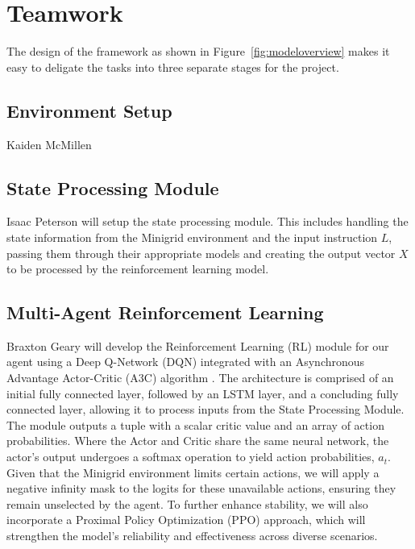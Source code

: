 \documentclass[11pt]{article}
\begin{document}
\section{Teamwork}

The design of the framework as shown in Figure~\ref{fig:modeloverview} makes it easy to deligate the tasks into three separate stages for the project. 

\subsection{Environment Setup}

Kaiden McMillen

\subsection{State Processing Module}
Isaac Peterson will setup the state processing module. This includes handling the state information from the Minigrid environment and the input instruction $L$, passing them through their appropriate models and creating the output vector $X$ to be processed by the reinforcement learning model. 

\subsection{Multi-Agent Reinforcement Learning}

Braxton Geary will develop the Reinforcement Learning (RL) module for our agent using a Deep Q-Network (DQN) integrated with an 
Asynchronous Advantage Actor-Critic (A3C) algorithm \cite{Mnih2016}. The architecture is comprised of an initial fully connected layer, followed by an LSTM layer, 
and a concluding fully connected layer, allowing it to process inputs from the State Processing Module. The module outputs a tuple with a scalar 
critic value and an array of action probabilities. Where the Actor and Critic share the same neural network, the actor's output undergoes a softmax operation 
to yield action probabilities, \( a_t \). Given that the Minigrid environment limits certain actions, we will apply a negative infinity mask to the logits for 
these unavailable actions, ensuring they remain unselected by the agent. To further enhance stability, we will also incorporate a Proximal Policy Optimization (PPO) 
approach, which will strengthen the model's reliability and effectiveness across diverse scenarios.

% 


\end{document}
